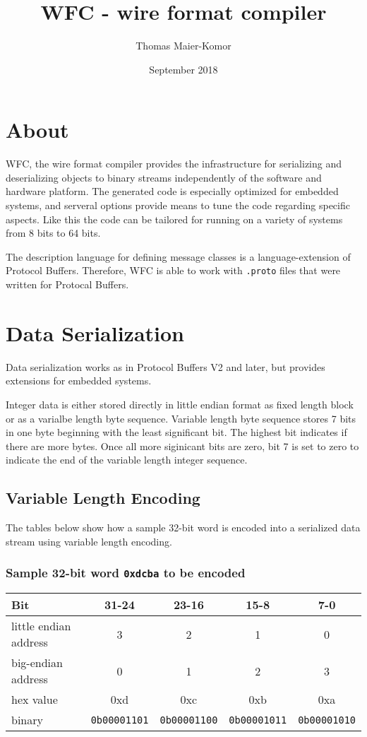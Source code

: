 \documentclass[12pt]{article}
\title{WFC - wire format compiler}
\author{Thomas Maier-Komor}
\date{September 2018}
\begin{document}
\maketitle

\section{About}
WFC, the wire format compiler provides the infrastructure for
serializing and deserializing objects to binary streams independently of
the software and hardware platform. The generated code is especially
optimized for embedded systems, and serveral options provide means to
tune the code regarding specific aspects. Like this the code can be
tailored for running on a variety of systems from 8 bits to 64 bits.

The description language for defining message classes is a
language-extension of Protocol Buffers. Therefore, WFC is able to work
with {\tt .proto} files that were written for Protocal Buffers.

\section{Data Serialization}
Data serialization works as in Protocol Buffers V2 and later, but provides
extensions for embedded systems.

Integer data is either stored directly in little endian format as fixed length
block or as a varialbe length byte sequence. Variable length byte sequence
stores 7 bits in one byte beginning with the least significant bit. The highest
bit indicates if there are more bytes. Once all more siginicant bits are zero,
bit 7 is set to zero to indicate the end of the variable length integer
sequence.


\subsection{Variable Length Encoding}

The tables below show how a sample 32-bit word is encoded into a serialized
data stream using variable length encoding.

\subsubsection*{Sample 32-bit word {\tt 0xdcba} to be encoded}
\begin{tabular}{|l|c|c|c|c|}
\hline
	Bit&31-24&23-16&15-8&7-0\\
\hline
	little endian address & {3} & {2} & {1} & {0} \\
\hline
	big-endian address & {0} & {1} & {2} & {3} \\
\hline
	hex value& {0xd} & {0xc} & {0xb} & {0xa} \\
\hline
	binary & {\tt 0b00001101} & {\tt 0b00001100} & {\tt 0b00001011} & {\tt 0b00001010}\\
\hline
\end{tabular}
\end{document}
